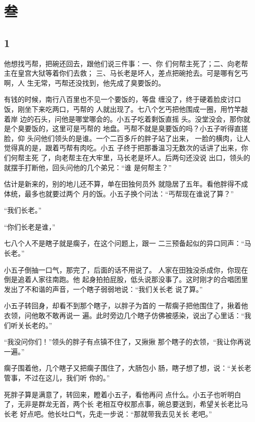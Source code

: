 \section{叁}

{\centering\subsection{1}}

他想找丐帮，把碗还回去，跟他们说三件事：一、你
们何帮主死了；二、向老帮主在皇宫大狱等着你们去救；
三、马长老是坏人，差点把碗抢去。可是哪有乞丐啊，人
生无常，丐帮还没找到，他先成了臭要饭的。

有钱的时候，南行八百里也不见一个要饭的，等盘
缠没了，终于硬着脸皮讨口饭，刚坐下来吃两口，丐帮的
人就出现了。七八个乞丐把他围成一圈，用竹竿敲着岸
边的石头，问他是哪堂哪会的。小五子吃着剩饭直摇
头。没堂没会，那你就是个臭要饭的，这里可是丐帮的
地盘。丐帮不就是臭要饭的吗？小五子听得直搓脸，仰
头问他们领头的是谁。一个二百多斤的胖子站了出来，
一脸的横肉，让人觉得真的是，跟着丐帮有肉吃。小五
子终于把那番温习无数次的话讲了出来，你们何帮主死
了，向老帮主在大牢里，马长老是坏人。后两句还没说
出口，领头的就摆手打断他，回头问他的几个弟兄：“谁
是何帮主？”

估计是新来的，别的地儿还不算，单在田独何员外
就隐居了五年。看他胖得不成体统，最多也就要过两个
月的饭。小五子换个问法：“丐帮现在谁说了算？”

“我们长老。”

“你们长老是谁，”

七八个人不是瞎子就是瘸子，在这个问题上，跟一
二三预备起似的异口同声：“马长老。”

小五子倒抽一口气，那完了，后面的话不用说了。
人家在田独没杀成你，你现在倒是追着人家往南跑。他
起身拍拍屁股，低头说那没事了。这时刚才的合唱团里
发出了不和谐的声音，一个瞎子弱弱地说：“我们关长老
说了算。”

小五子转回身，却看不到那个瞎子，以胖子为首的
一帮瘸子把他围住了，揪着他衣领，问他敢不敢再说一
遍。此时旁边几个瞎子仿佛被感染，说出了心里话：“我
们听关长老的。”

“我没问你们！”领头的胖子有点镇不住了，又揪揪
那个瞎子的衣领，“我让你再说一遍。”

瘸子围着他，几个瞎子又把瘸子围住了，大肠包小
肠，瞎子想了想，说：“关长老管事，不过在这儿，我们听
你的。”

死胖子算是满意了，转回来，瞪着小五子，看他再问
点什么。小五子也听明白了，无非是群龙无首，两个长
老相互夺权那点事，碗总要送到，希望关长老比马长老
好点吧。他长吐口气，先走一步说：“那就带我去见关长
老吧。”

